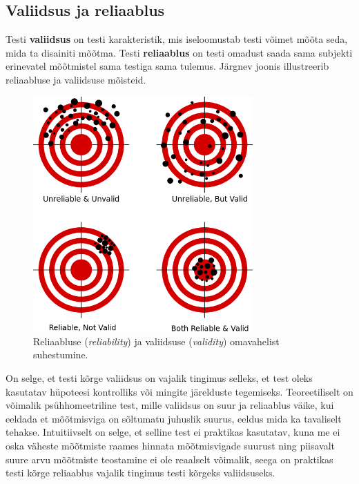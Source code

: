 \documentclass[a4paper]{article}
\numberwithin{equation}{section}
\theoremstyle{definition}
\begin{document}
\subsection{Valiidsus ja reliaablus}
Testi \textbf{valiidsus} on testi karakteristik, mis iseloomustab testi võimet mõõta seda, mida ta disainiti mõõtma. 
Testi \textbf{reliaablus} on testi omadust saada sama subjekti erinevatel mõõtmistel sama testiga sama tulemus. Järgnev joonis illustreerib reliaabluse ja valiidsuse mõisteid.

\begin{figure}[H]
\centering
\includegraphics[width=0.75\textwidth, height = 0.8\textwidth]{Reliability_and_validity.png}
\caption{Reliaabluse (\textit{reliability}) ja valiidsuse (\textit{validity}) omavahelist suhestumine.  \cite{Dilmen2008}}
\label{reliability_and_validity}
\end{figure}

On selge, et testi kõrge valiidsus on vajalik tingimus selleks, et test oleks kasutatav h\"upoteesi kontrolliks või mingite järelduste tegemiseks. Teoreetiliselt on võimalik ps\"uhhomeetriline test, mille valiidsus on suur ja reliaablus väike, kui eeldada et mõõtmisviga on sõltumatu juhuslik suurus, eeldus mida ka tavaliselt tehakse. Intuitiivselt on selge, et selline test ei praktikas kasutatav, kuna me ei oska väheste mõõtmiste raames hinnata mõõtmisvigade suurust ning piisavalt suure arvu mõõtmiste teostamine ei ole reaalselt võimalik, seega on praktikas testi kõrge reliaablus vajalik tingimus testi kõrgeks valiidsuseks.    
\end{document}
